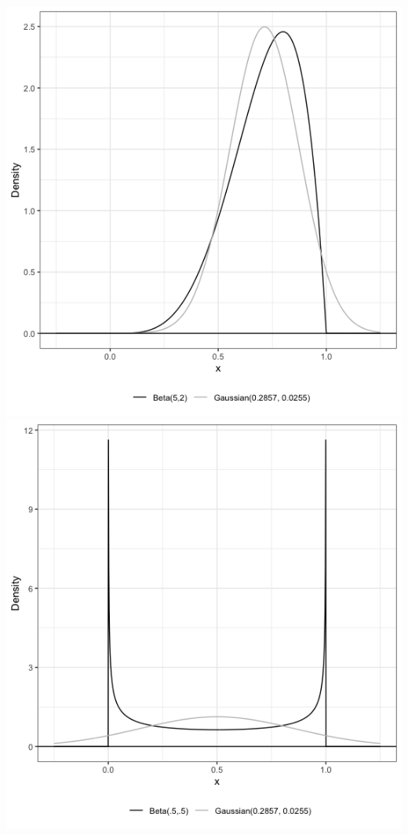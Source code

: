 \documentclass{article}\usepackage[]{graphicx}\usepackage[]{xcolor}
\begin{document}
\includegraphics[scale=0.3]{beta distribution with alpha 5 beta 2.png}
\includegraphics[scale=0.3]{beta distribution with alpha .5 beta .5.png}
\end{document}
